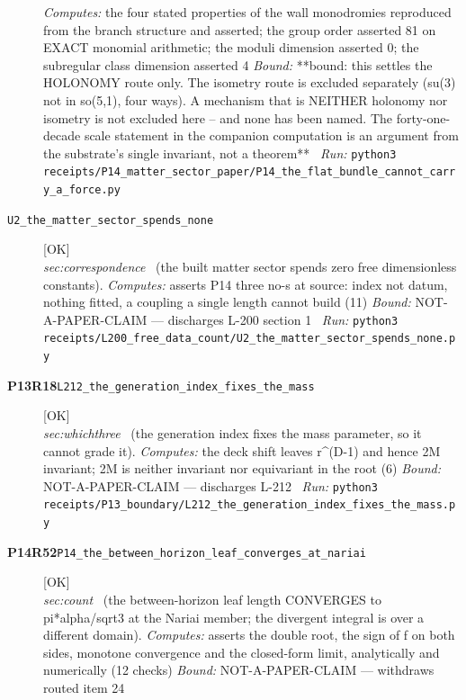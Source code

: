 \begin{description}
\emph{Computes:} the four stated properties of the wall monodromies reproduced from the branch structure and asserted; the group order asserted 81 on EXACT monomial arithmetic; the moduli dimension asserted 0; the subregular class dimension asserted 4
 \emph{Bound:} **bound: this settles the HOLONOMY route only. The isometry route is excluded separately (su(3) not in so(5,1), four ways). A mechanism that is NEITHER holonomy nor isometry is not excluded here -- and none has been named. The forty-one-decade scale statement in the companion computation is an argument from the substrate's single invariant, not a theorem**
\ \emph{Run:} \texttt{python3 receipts/P14\_matter\_sector\_paper/P14\_the\_flat\_bundle\_cannot\_carry\_a\_force.py}
\item[\label{rcpt:U2_the_matter_sector_spends_none}\textbf{}\quad\texttt{U2\_the\_matter\_sector\_spends\_none}]\hfill\textsf{[OK]}\\
\textit{sec:correspondence} \ (the built matter sector spends zero free dimensionless constants). 
\emph{Computes:} asserts P14 three no-s at source: index not datum, nothing fitted, a coupling a single length cannot build (11)
 \emph{Bound:} NOT-A-PAPER-CLAIM --- discharges L-200 section 1
\ \emph{Run:} \texttt{python3 receipts/L200\_free\_data\_count/U2\_the\_matter\_sector\_spends\_none.py}
\item[\rcptlabel{L212_the_generation_index_fixes_the_mass}{P13R18}\textbf{P13R18}\quad\texttt{L212\_the\_generation\_index\_fixes\_the\_mass}]\hfill\textsf{[OK]}\\
\textit{sec:whichthree} \ (the generation index fixes the mass parameter, so it cannot grade it). 
\emph{Computes:} the deck shift leaves r\textasciicircum{}(D-1) and hence 2M invariant; 2M is neither invariant nor equivariant in the root (6)
 \emph{Bound:} NOT-A-PAPER-CLAIM --- discharges L-212
\ \emph{Run:} \texttt{python3 receipts/P13\_boundary/L212\_the\_generation\_index\_fixes\_the\_mass.py}
\item[\rcptlabel{P14_the_between_horizon_leaf_converges_at_nariai}{P14R52}\textbf{P14R52}\quad\texttt{P14\_the\_between\_horizon\_leaf\_converges\_at\_nariai}]\hfill\textsf{[OK]}\\
\textit{sec:count} \ (the between-horizon leaf length CONVERGES to pi*alpha/sqrt3 at the Nariai member; the divergent integral is over a different domain). 
\emph{Computes:} asserts the double root, the sign of f on both sides, monotone convergence and the closed-form limit, analytically and numerically (12 checks)
 \emph{Bound:} NOT-A-PAPER-CLAIM --- withdraws routed item 24

\end{description}
